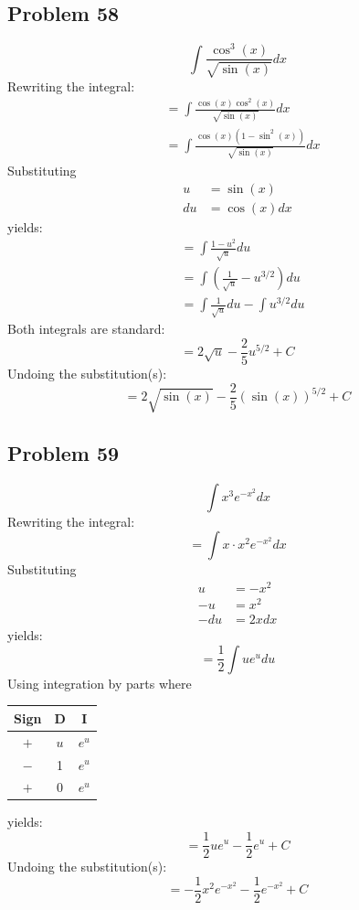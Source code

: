 \documentclass{article}
\begin{document}
\subsection*{Problem 58}
$$\int\frac{\cos^3\left(x\right)}{\sqrt{\sin\left(x\right)}}dx$$
Rewriting the integral:
\begin{align*}
&=\int\frac{\cos(x)\cos^2(x)}{\sqrt{\sin(x)}}dx \\
&=\int\frac{\cos(x)(1-\sin^2(x))}{\sqrt{\sin(x)}}dx
\end{align*}
Substituting
\begin{align*}
u&=\sin(x) \\
du&=\cos(x)dx
\end{align*}
yields:
\begin{align*}
&=\int\frac{1-u^2}{\sqrt{u}}du \\
&=\int\left(\frac{1}{\sqrt{u}}-u^{3/2}\right)du \\
&=\int\frac{1}{\sqrt{u}}du-\int u^{3/2}du
\end{align*}
Both integrals are standard:
$$=2\sqrt{u}-\frac{2}{5}u^{5/2}+C$$
Undoing the substitution(s):
$$=2\sqrt{\sin(x)}-\frac{2}{5}\left(\sin(x)\right)^{5/2}+C$$
\subsection*{Problem 59}
$$\int x^3e^{-x^2}dx$$
Rewriting the integral:
$$=\int x\cdot x^2e^{-x^2}dx$$
Substituting
\begin{align*}
u&=-x^2 \\
-u&=x^2 \\
-du&=2xdx
\end{align*}
yields:
$$=\frac{1}{2}\int ue^udu$$
Using integration by parts where
\begin{center}
\begin{tabular}{ |c|c|c| } 
 \hline
 Sign & D & I \\
 \hline
 $+$ & $u$ & $e^u$ \\ 
 $-$ & 1 & $e^u$ \\
 $+$ & 0 & $e^u$ \\
 \hline
\end{tabular}
\end{center}
yields:
$$=\frac{1}{2}ue^u-\frac{1}{2}e^u+C$$
Undoing the substitution(s):
$$=-\frac{1}{2}x^2e^{-x^2}-\frac{1}{2}e^{-x^2}+C$$
\end{document}
